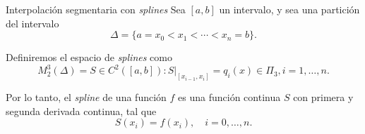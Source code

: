 \begin{frame}{Interpolación segmentaria con \textit{splines}}
    Sea $[a, b]$ un intervalo, y sea una partición del intervalo
    \[\Delta = \{a = x_0 < x_1 < \cdots < x_n = b\}.\]
    
    Definiremos el espacio de \textit{splines} como
    \[
        M_2^3(\Delta)
        = {S \in C^2([a, b]) : S|_{[x_{i-1}, x_ i]}
        = q_ i(x) \in \Pi_3, i = 1,\dots, n}.
    \]

    Por lo tanto, el \textit{spline} de una función $f$ es una función
    continua $S$ con primera y segunda derivada continua, tal que
    \[
        S(x_i) = f(x_i), \quad i = 0, \dots, n.
    \]
\end{frame}
